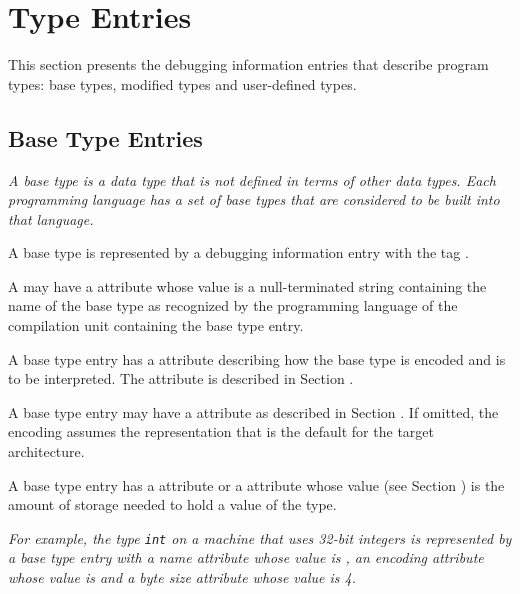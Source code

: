 \chapter{Type Entries}
\label{chap:typeentries}
This section presents the debugging information entries
that describe program types: base types, modified types and
user-defined types.


\section{Base Type Entries}
\label{chap:basetypeentries}

\textit{A base type is a data type that is not defined in terms of
other data types.
Each programming language has a set of base
types that are considered to be built into that language.}

A base type is represented by a debugging information entry
with the tag \DWTAGbasetypeTARG.

A 
may have a \DWATname{} attribute
whose value is
a null-terminated string containing the name of the base type
as recognized by the programming language of the compilation
unit containing the base type entry.

A base type entry has
a \DWATencoding{} attribute describing
how the base type is encoded and is to be interpreted.
The \DWATencoding{} attribute is described in
Section .

A base type entry
may have a \DWATendianity{} attribute
as described in
Section .
If omitted, the encoding assumes the representation that
is the default for the target architecture.

A base type entry has a
\DWATbytesize{}\hypertarget{chap:DWATbytesizedataobjectordatatypesize}{}
attribute or a
\DWATbitsize{}\hypertarget{chap:DWATbitsizebasetypebitsize}{}
attribute whose  value
(see Section )
is the amount of storage needed to hold a value of the type.

\textit{For example, the
 type \texttt{int} on a machine that uses 32-bit
integers is represented by a base type entry with a name
attribute whose value is , an encoding attribute
whose value is \DWATEsigned{}
and a byte size attribute whose value is 4.}

